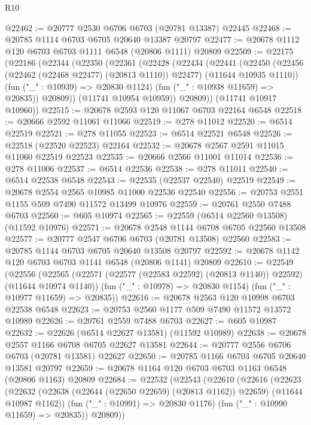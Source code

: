 \begin{lexlean}{R10}
\begin{coremodule}
@22462 := @20777 @2530 @6706 @6703 (@20781 @13387) @22445
@22468 := @20785 @1114 @6703 @6705 @20640 @13387 @20797
@22477 := @20678 @1112 @120 @6703 @6703 @1111 @6548 (@20806 @1111) @20809
@22509 := @22175
    (@22186
      (@22344
        (@22350
          (@22361
            (@22428
              (@22434
                (@22441
                  (@22450
                    (@22456 (@22462 (@22468 @22477) (@20813 @1110)) @22477)
                    (@11644 @10935 @1110))
                  (fun ("_" : @10939) => @20830 @1124)
                  (fun ("_" : @10938 @11659) => @20835))
                @20809))
            (@11741 @10954 @10959))
          @20809))
      (@11741 @10917 @10960))
@22515 := @20678 @2593 @120 @11067 @6703 @22164 @6548
@22518 := @20666 @2592 @11061 @11066
@22519 := @278 @11012
@22520 := @6514 @22519
@22521 := @278 @11055
@22523 := @6514 @22521 @6548
@22526 := @22518 (@22520 @22523) @22164
@22532 := @20678 @2567 @2591 @11015 @11060 @22519 @22523
@22535 := @20666 @2566 @11001 @11014
@22536 := @278 @11006
@22537 := @6514 @22536
@22538 := @278 @11011
@22540 := @6514 @22538 @6548
@22543 := @22535 (@22537 @22540) @22519
@22549 := @20678 @2554 @2565 @10985 @11000 @22536 @22540
@22556 := @20753 @2551 @1155 @509 @7490 @11572 @13499 @10976
@22559 := @20761 @2550 @7488 @6703
@22560 := @605 @10974
@22565 := @22559 (@6514 @22560 @13508) (@11592 @10976)
@22571 := @20678 @2548 @1144 @6708 @6705 @22560 @13508
@22577 := @20777 @2547 @6706 @6703 (@20781 @13508) @22560
@22583 := @20785 @1144 @6703 @6705 @20640 @13508 @20797
@22592 := @20678 @1142 @120 @6703 @6703 @1141 @6548 (@20806 @1141) @20809
@22610 := @22549
    (@22556
      (@22565 (@22571 (@22577 (@22583 @22592) (@20813 @1140)) @22592) (@11644 @10974 @1140))
      (fun ("_" : @10978) => @20830 @1154)
      (fun ("_" : @10977 @11659) => @20835))
@22616 := @20678 @2563 @120 @10998 @6703 @22538 @6548
@22623 := @20753 @2560 @1177 @509 @7490 @11572 @13572 @10989
@22626 := @20761 @2559 @7488 @6703
@22627 := @605 @10987
@22632 := @22626 (@6514 @22627 @13581) (@11592 @10989)
@22638 := @20678 @2557 @1166 @6708 @6705 @22627 @13581
@22644 := @20777 @2556 @6706 @6703 (@20781 @13581) @22627
@22650 := @20785 @1166 @6703 @6705 @20640 @13581 @20797
@22659 := @20678 @1164 @120 @6703 @6703 @1163 @6548 (@20806 @1163) @20809
@22684 := @22532
    (@22543
      (@22610
        (@22616
          (@22623
            (@22632 (@22638 (@22644 (@22650 @22659) (@20813 @1162)) @22659) (@11644 @10987 @1162))
            (fun ("_" : @10991) => @20830 @1176)
            (fun ("_" : @10990 @11659) => @20835))
          @20809))

\end{coremodule}
\end{lexlean}
